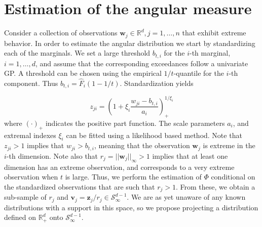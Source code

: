 \section{Estimation of the angular measure}

Consider a collection of observations $\bm{w}_j\in {\mathbb R}^d, j=1, \ldots , n$ that exhibit extreme behavior. In order to estimate the angular distribution we start by standardizing each of the marginals. We set a large threshold $b_{t,i}$ for the $i$-th marginal, $i=1, \ldots ,d$, and assume that the corresponding exceedances follow a univariate GP. A threshold can be chosen using the empirical $1/t$-quantile for the $i$-th component. Thus $b_{t,i} = \hat{F}_i(1 - 1/t)$. Standardization yields

\begin{equation}
    \label{eqn:standardization}
    z_{ji} = \left(1 + \xi_{i}\frac{w_{ji} - b_{t,i}}{a_{i}}\right)_{+}^{1/\xi_{i}}
\end{equation}
  where $(\cdot)_{+}$ indicates the positive part function. The scale parameters $a_{i}$, and extremal indexes $\xi_{i}$ can be fitted using a likelihood based method.
 Note that $z_{ji} > 1$ implies that $w_{ji} > b_{t,i}$, meaning that the observation
  $\bm{w}_j$ is extreme in the $i$-th dimension.  Note also that $r_j = ||\bm{w}_j||_\infty>1$ implies that at least one dimension has an extreme observation, and corresponds to a very extreme observation when $t$ is large. Thus, we perform the estimation of $\Phi$ conditional on the standardized observations that are such that $r_j>1$. From these, we obtain a sub-sample of $r_j$ and
  $\bm{v}_j = \bm{z}_j/r_j\in\mathcal{S}_{\infty}^{d-1}$. We are as yet unaware of any known distributions with a support
  in this space, so we propose projecting a distribution defined on ${\mathbb R}_{+}^{d}$ onto
  $\mathcal{S}_{\infty}^{d-1}$.

  

  

  
